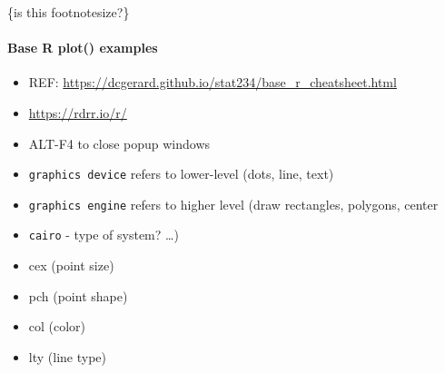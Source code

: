 \documentclass{article}
\begin{document}
\footnotesize \{is this footnotesize?\}

\hypertarget{base-r-plot-examples}{%
\paragraph{Base R plot() examples}\label{base-r-plot-examples}}

\begin{itemize}
\item
  REF: \url{https://dcgerard.github.io/stat234/base_r_cheatsheet.html}
\item
  \url{https://rdrr.io/r/}
\item
  ALT-F4 to close popup windows
\item
  \texttt{graphics\ device} refers to lower-level (dots, line, text)
\item
  \texttt{graphics\ engine} refers to higher level (draw rectangles,
  polygons, center
\item
  \texttt{cairo} - type of system? \ldots)
\item
  cex (point size)
\item
  pch (point shape)
\item
  col (color)
\item
  lty (line type)
\end{itemize}
\end{document}
